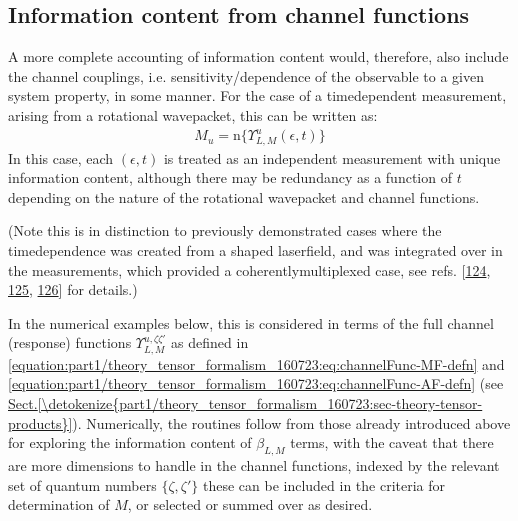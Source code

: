 \documentclass[letterpaper,table,10pt,english]{jupyterBook}
\begin{document}
\subsection{Information content from channel functions}
\label{\detokenize{part1/theory_info_content_200723:information-content-from-channel-functions}}
\sphinxAtStartPar
A more complete accounting of information content would, therefore, also
include the channel couplings, i.e. sensitivity/dependence of the
observable to a given system property, in some manner. For the case of a
time\sphinxhyphen{}dependent measurement, arising from a rotational wavepacket, this
can be written as:
\begin{equation*}
\begin{split}M_{u}=\mathrm{n}\{\varUpsilon_{L,M}^{u}(\epsilon,t)\}\end{split}
\end{equation*}
\sphinxAtStartPar
In this case, each \((\epsilon,t)\) is treated as an independent
measurement with unique information content, although there may be
redundancy as a function of \(t\) depending on the nature of the
rotational wavepacket and channel functions.

\sphinxAtStartPar
(Note this is in
distinction to previously demonstrated cases where the time\sphinxhyphen{}dependence
was created from a shaped laser\sphinxhyphen{}field, and was integrated over in the
measurements, which provided a coherently\sphinxhyphen{}multiplexed case, see refs.
{[}\hyperlink{cite.backmatter/bibliography:id660}{124}, \hyperlink{cite.backmatter/bibliography:id662}{125}, \hyperlink{cite.backmatter/bibliography:id661}{126}{]} for details.)

\sphinxAtStartPar
In the numerical examples below, this is considered in terms of the full channel (response) functions \(\varUpsilon_{L,M}^{u,\zeta\zeta'}\) as defined in \eqref{equation:part1/theory_tensor_formalism_160723:eq:channelFunc-MF-defn} and \eqref{equation:part1/theory_tensor_formalism_160723:eq:channelFunc-AF-defn} (see \hyperref[\detokenize{part1/theory_tensor_formalism_160723:sec-theory-tensor-products}]{Sect.\@ \ref{\detokenize{part1/theory_tensor_formalism_160723:sec-theory-tensor-products}}}). Numerically, the routines follow from those already introduced above for exploring the information content of \(\beta_{L,M}\) terms, with the caveat that there are more dimensions to handle in the channel functions, indexed by the relevant set of quantum numbers \(\{\zeta,\zeta'\}\) \sphinxhyphen{} these can be included in the criteria for determination of \(M\), or selected or summed over as desired.
\end{document}
